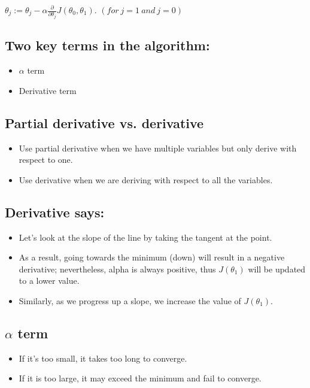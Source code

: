 \documentclass{article}
\begin{document}
\begin{algorithm}
  \caption{Gradient Descent}\label{euclid}
  \begin{algorithmic}[1]
    \Large
    \State $\theta_j := \theta_j - \alpha \frac{\partial}{\partial \theta_j} J(\theta_0, \theta_1)$.
    \State $(for\ j = 1\ and\ j=0)$
    \EndWhile
  \end{algorithmic}
\end{algorithm}

\subsection*{Two key terms in the algorithm:}
\begin{itemize}
  \item $\alpha$ term
  \item Derivative term
\end{itemize}

\subsection*{Partial derivative vs. derivative}
\begin{itemize}
  \item Use partial derivative when we have multiple variables but only derive with respect to one.
  \item Use derivative when we are deriving with respect to all the variables.
\end{itemize}

\subsection*{Derivative says:}
\begin{itemize}
  \item Let's look at the slope of the line by taking the tangent at the point.
  \item As a result, going towards the minimum (down) will result in a negative derivative; nevertheless, alpha is always positive, thus $J(\theta_1)$ will be updated to a lower value.
  \item Similarly, as we progress up a slope, we increase the value of $J(\theta_1)$.
\end{itemize}

\subsection*{$\alpha$ term}
\begin{itemize}
  \item If it's too small, it takes too long to converge.
  \item If it is too large, it may exceed the minimum and fail to converge.
\end{itemize}
\end{document}
